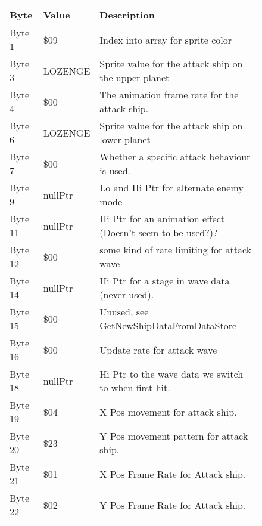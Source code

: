 \begin{figure}[H]
{\begin{adjustbox}{width=12cm}
\begin{tabular}{lll}
\toprule
 Byte    & Value                     & Description                                                        \\
\midrule
 Byte 1  & \$09                       & Index into array for sprite color                                  \\
 Byte 3  & LOZENGE                   & Sprite value for the attack ship on the upper planet               \\
 Byte 4  & \$00                       & The animation frame rate for the attack ship.                      \\
 Byte 6  & LOZENGE                   & Sprite value for the attack ship on lower planet                   \\
 Byte 7  & \$00                       & Whether a specific attack behaviour is used.                       \\
 Byte 9  & nullPtr                   & Lo and Hi Ptr for alternate enemy mode                             \\
 Byte 11 & nullPtr                   & Hi Ptr for an animation effect (Doesn't seem to be used?)?         \\
 Byte 12 & \$00                       & some kind of rate limiting for attack wave                         \\
 Byte 14 & nullPtr                   & Hi Ptr for a stage in wave data (never used).                      \\
 Byte 15 & \$00                       & Unused, see GetNewShipDataFromDataStore                            \\
 Byte 16 & \$00                       & Update rate for attack wave                                        \\
 Byte 18 & nullPtr                   & Hi Ptr to the wave data we switch to when first hit.               \\
 Byte 19 & \$04                       & X Pos movement for attack ship.                                    \\
 Byte 20 & \$23                       & Y Pos movement pattern for attack ship.                            \\
 Byte 21 & \$01                       & X Pos Frame Rate for Attack ship.                                  \\
 Byte 22 & \$02                       & Y Pos Frame Rate for Attack ship.                                  \\

\end{tabular}
\end{adjustbox}}
\end{figure}
